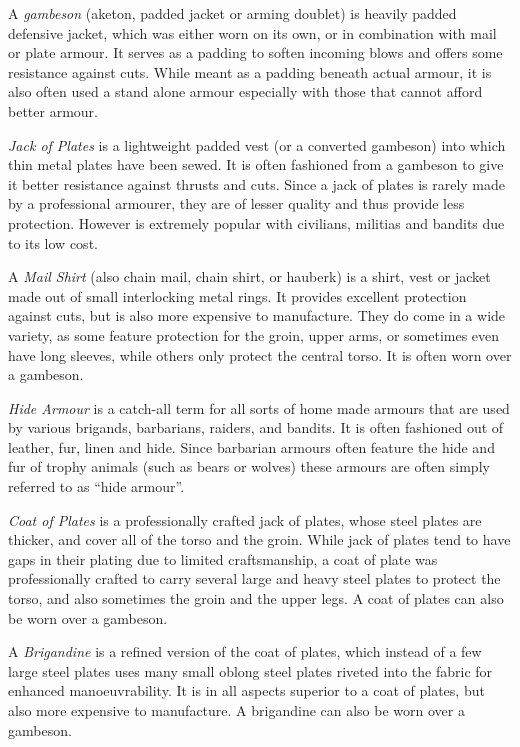 A \emph{gambeson} (aketon, padded jacket or arming doublet) is heavily padded
defensive jacket, which was either worn on its own, or in combination with
mail or plate armour. It serves as a padding to soften incoming blows and
offers some resistance against cuts. While meant as a padding beneath actual
armour, it is also often used a stand alone armour especially with those that
cannot afford better armour.

\emph{Jack of Plates} is a lightweight padded vest (or a converted gambeson)
into which thin metal plates have been sewed. It is often fashioned from a
gambeson to give it better resistance against thrusts and cuts. Since a jack
of plates is rarely made by a professional armourer, they are of lesser quality
and thus provide less protection. However is extremely popular with civilians,
militias and bandits due to its low cost.

A \emph{Mail Shirt} (also chain mail, chain shirt, or hauberk) is a shirt,
vest or jacket made out of small interlocking metal rings. It provides
excellent protection against cuts, but is also more expensive to
manufacture. They do come in a wide variety, as some feature protection for
the groin, upper arms, or sometimes even have long sleeves, while others only
protect the central torso. It is often worn over a gambeson.

\emph{Hide Armour} is a catch-all term for all sorts of home made armours
that are used by various brigands, barbarians, raiders, and bandits. It is often
fashioned out of leather, fur, linen and hide. Since barbarian armours often
feature the hide and fur of trophy animals (such as bears or wolves) these
armours are often simply referred to as ``hide armour''.

\emph{Coat of Plates} is a professionally crafted jack of plates, whose steel
plates are thicker, and cover all of the torso and the groin. While jack of
plates tend to have gaps in their plating due to limited craftsmanship, a coat
of plate was professionally crafted to carry several large and heavy steel
plates to protect the torso, and also sometimes the groin and the upper legs. A
coat of plates can also be worn over a gambeson.

A \emph{Brigandine} is a refined version of the coat of plates, which instead of
a few large steel plates uses many small oblong steel plates riveted into the
fabric for enhanced manoeuvrability. It is in all aspects superior to a coat of
plates, but also more expensive to manufacture. A brigandine can also be worn
over a gambeson.

